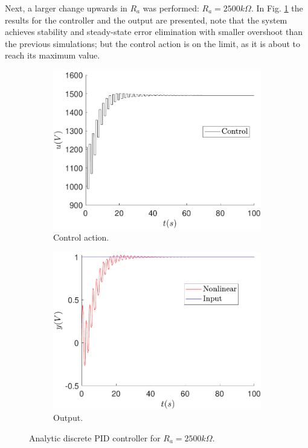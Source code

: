 	Next, a larger change upwards in $R_a$ was performed: $R_a=2500k\Omega$. In Fig. \ref{fig:sens_ra_2500} the results for the controller and the output are presented, note that the system achieves stability and steady-state error elimination with smaller overshoot than the previous simulations; but the control action is on the limit, as it is about to reach its maximum value.
	
	\begin{figure}
        \centering
        \begin{subfigure}[b]{0.475\textwidth}
            \centering
            \includegraphics[scale=0.425]{files/sens_analysis/PID/control_analytic_a_2500.pdf}
            \caption{Control action.}
        \end{subfigure}
        \vskip0.1cm
        \begin{subfigure}[b]{0.475\textwidth}   
            \centering 
            \includegraphics[scale=0.425]{files/sens_analysis/PID/analytic_sensitivity_a_2500.pdf}
            \caption{Output.}
        \end{subfigure}
        \caption{Analytic discrete PID controller for $R_a=2500k\Omega$.}
        \label{fig:sens_ra_2500}
	\end{figure}
	
